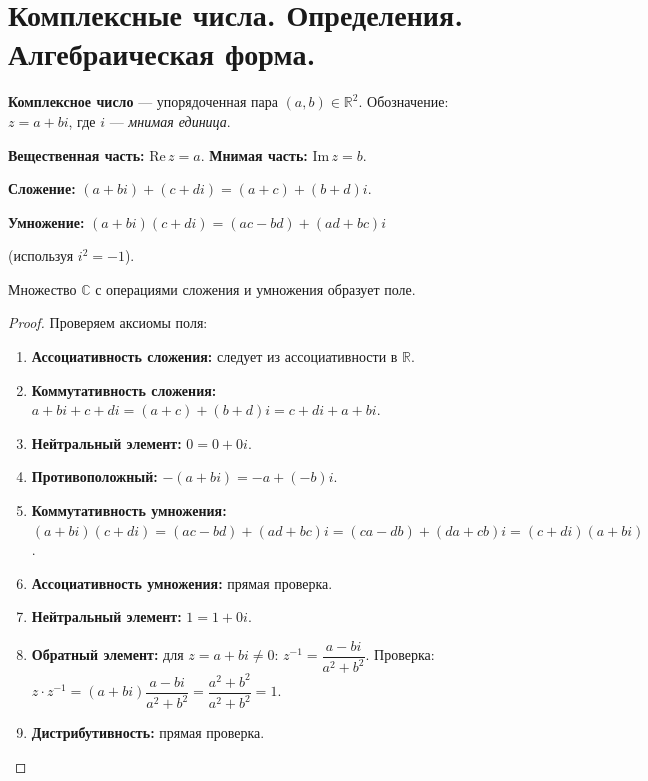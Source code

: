 \documentclass[12pt]{article}
\begin{document}
\section{Комплексные числа. Определения. Алгебраическая форма.}

\begin{definition}
\textbf{Комплексное число} --- упорядоченная пара $(a,b) \in \mathbb{R}^2$.
Обозначение: $z = a + bi$, где $i$ --- \emph{мнимая единица}.

\textbf{Вещественная часть:} $\mathrm{Re}\,z = a$.
\textbf{Мнимая часть:} $\mathrm{Im}\,z = b$.
\end{definition}

\begin{definition}
\textbf{Сложение:} $(a+bi) + (c+di) = (a+c) + (b+d)i$.

\textbf{Умножение:} $(a+bi)(c+di) = (ac-bd) + (ad+bc)i$

(используя $i^2 = -1$).
\end{definition}

\begin{theorem}
Множество $\mathbb{C}$ с операциями сложения и умножения образует поле.
\end{theorem}

\begin{proof}
Проверяем аксиомы поля:
\begin{enumerate}
\item \textbf{Ассоциативность сложения:} следует из ассоциативности в $\mathbb{R}$.
\item \textbf{Коммутативность сложения:} $a+bi + c+di = (a+c)+(b+d)i =
      c+di + a+bi$.
\item \textbf{Нейтральный элемент:} $0 = 0 + 0i$.
\item \textbf{Противоположный:} $-(a+bi) = -a + (-b)i$.
\item \textbf{Коммутативность умножения:}
      $(a+bi)(c+di) = (ac-bd)+(ad+bc)i =
      (ca-db)+(da+cb)i = (c+di)(a+bi)$.
\item \textbf{Ассоциативность умножения:} прямая проверка.
\item \textbf{Нейтральный элемент:} $1 = 1 + 0i$.
\item \textbf{Обратный элемент:} для $z = a+bi \neq 0$:
      $z^{-1} = \dfrac{a - bi}{a^2+b^2}$.
      Проверка: $z \cdot z^{-1} = (a+bi)\dfrac{a-bi}{a^2+b^2}
      = \dfrac{a^2+b^2}{a^2+b^2} = 1$.
\item \textbf{Дистрибутивность:} прямая проверка.
\end{enumerate}
\end{proof}
\end{document}
